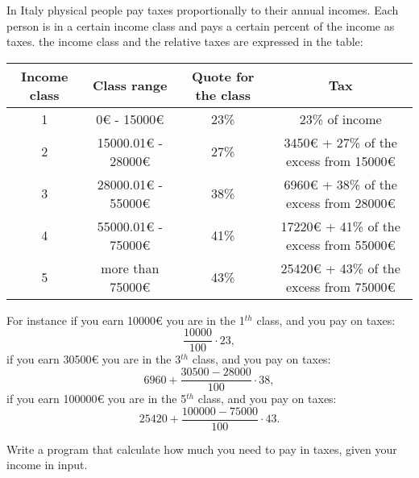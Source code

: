 



\ExamNameLine
\ExamStandardBoxEn
In Italy physical people pay taxes proportionally to their annual
incomes. Each person is in a certain income
class and pays a certain percent of the income as taxes.
the income class and the relative taxes are expressed in the table:
\begin{center}
  \begin{tabular}{|c|c|c|c|}
    \hline
    Income class&Class range&Quote for the class&Tax\\
    \hline
    \hline
    1&0\euro{} - 15000\euro&23\%&23\% of income\\
    \hline
    2&15000.01\euro{} - 28000\euro&27\%&3450\euro{} + 27\% of the
    excess from 15000\euro\\
    \hline
    3&28000.01\euro{} - 55000\euro&38\%&6960\euro{} + 38\% of the
    excess from 28000\euro\\
    \hline
    4&55000.01\euro{} - 75000\euro&41\%&17220\euro{} + 41\% of the
    excess from 55000\euro\\
    \hline
    5&more than 75000\euro&43\%&25420\euro{} + 43\% of the
    excess from 75000\euro\\
    \hline
  \end{tabular}
\end{center}

For instance if you earn 10000\euro{} you are in the 1$^{th}$ class,
and you pay on taxes:
$$
\frac{10000}{100}\cdot 23,
$$
if you earn 30500\euro{} you are in the 3$^{th}$ class,
and you pay on taxes:
$$
6960+\frac{30500-28000}{100}\cdot 38,
$$
if you earn 100000\euro{} you are in the 5$^{th}$ class,
and you pay on taxes:
$$
25420+\frac{100000-75000}{100}\cdot 43.
$$

Write a program that calculate how much you need to pay in
taxes, given your income in input.

